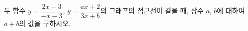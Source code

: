 두 함수 $y=\dfrac{2x-3}{-x-3}$, $y=\dfrac{ax+2}{3x+b}$의 그래프의 점근선이 같을 때, 상수 $a$, $b$에 대하여 $a+b$의 값을 구하시오.
